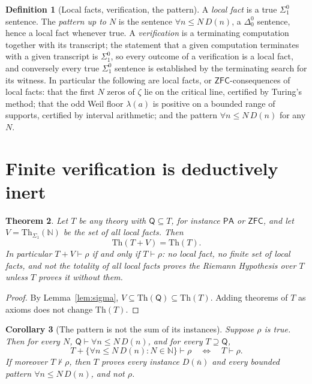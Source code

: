 \documentclass[11pt]{article}
\newtheorem{theorem}{Theorem}[section]
\newtheorem{corollary}[theorem]{Corollary}
\theoremstyle{definition}
\newtheorem{definition}[theorem]{Definition}
\theoremstyle{remark}
\newcommand{\N}{\mathbb N}
\newcommand{\PA}{\mathsf{PA}}
\newcommand{\ZFC}{\mathsf{ZFC}}
\newcommand{\RA}{\mathsf{Q}}
\newcommand{\Th}{\mathrm{Th}}
\newcommand{\Sigone}{\Sigma^0_1}
\newcommand{\Dzero}{\Delta^0_0}
\begin{document}
\begin{definition}[Local facts, verification, the pattern]
A \emph{local fact} is a true $\Sigone$ sentence. The \emph{pattern up to $N$} is the sentence $\forall n\le N\,D(n)$, a $\Dzero$ sentence, hence a local fact whenever true. A \emph{verification} is a terminating computation together with its transcript; the statement that a given computation terminates with a given transcript is $\Sigone$, so every outcome of a verification is a local fact, and conversely every true $\Sigone$ sentence is established by the terminating search for its witness. In particular the following are local facts, or $\ZFC$-consequences of local facts: that the first $N$ zeros of $\zeta$ lie on the critical line, certified by Turing's method; that the odd Weil floor $\lambda(a)$ is positive on a bounded range of supports, certified by interval arithmetic; and the pattern $\forall n\le N\,D(n)$ for any $N$.
\end{definition}

\section{Finite verification is deductively inert}

\begin{theorem}\label{thm:inert}
Let $T$ be any theory with $\RA\subseteq T$, for instance $\PA$ or $\ZFC$, and let $V=\Th_{\Sigma_1}(\N)$ be the set of all local facts. Then
\[
\Th(T+V)=\Th(T).
\]
In particular $T+V\vdash\rho$ if and only if $T\vdash\rho$: no local fact, no finite set of local facts, and not the totality of all local facts proves the Riemann Hypothesis over $T$ unless $T$ proves it without them.
\end{theorem}

\begin{proof}
By Lemma~\ref{lem:sigma}, $V\subseteq\Th(\RA)\subseteq\Th(T)$. Adding theorems of $T$ as axioms does not change $\Th(T)$.
\end{proof}

\begin{corollary}[The pattern is not the sum of its instances]\label{cor:pattern}
Suppose $\rho$ is true. Then for every $N$, $\RA\vdash\forall n\le N\,D(n)$, and for every $T\supseteq\RA$,
\[
T+\{\forall n\le N\,D(n):N\in\N\}\vdash\rho\quad\Longleftrightarrow\quad T\vdash\rho .
\]
If moreover $T\nvdash\rho$, then $T$ proves every instance $D(\bar n)$ and every bounded pattern $\forall n\le N\,D(n)$, and not $\rho$.
\end{corollary}
\end{document}
